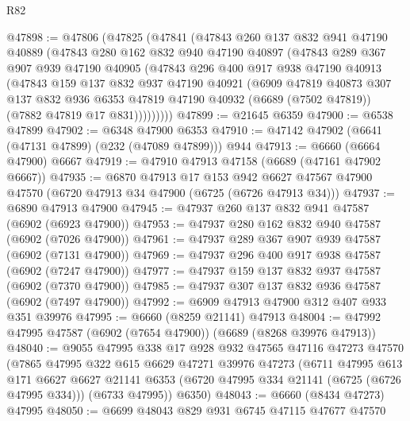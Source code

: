 \begin{lexlean}{R82}
\begin{coremodule}
@47898 := @47806
    (@47825
      (@47841
        (@47843
          @260
          @137
          @832
          @941
          @47190
          @40889
          (@47843
            @280
            @162
            @832
            @940
            @47190
            @40897
            (@47843
              @289
              @367
              @907
              @939
              @47190
              @40905
              (@47843
                @296
                @400
                @917
                @938
                @47190
                @40913
                (@47843
                  @159
                  @137
                  @832
                  @937
                  @47190
                  @40921
                  (@6909
                    @47819
                    @40873
                    @307
                    @137
                    @832
                    @936
                    @6353
                    @47819
                    @47190
                    @40932
                    (@6689 (@7502 @47819))
                    (@7882 @47819 @17 @831)))))))))
@47899 := @21645 @6359
@47900 := @6538 @47899
@47902 := @6348 @47900 @6353
@47910 := @47142 @47902 (@6641 (@47131 @47899) (@232 (@47089 @47899))) @944
@47913 := @6660 (@6664 @47900) @6667
@47919 := @47910 @47913 @47158 (@6689 (@47161 @47902 @6667))
@47935 := @6870
    @47913
    @17
    @153
    @942
    @6627
    @47567
    @47900
    @47570
    (@6720 @47913 @34 @47900 (@6725 (@6726 @47913 @34)))
@47937 := @6890 @47913 @47900
@47945 := @47937 @260 @137 @832 @941 @47587 (@6902 (@6923 @47900))
@47953 := @47937 @280 @162 @832 @940 @47587 (@6902 (@7026 @47900))
@47961 := @47937 @289 @367 @907 @939 @47587 (@6902 (@7131 @47900))
@47969 := @47937 @296 @400 @917 @938 @47587 (@6902 (@7247 @47900))
@47977 := @47937 @159 @137 @832 @937 @47587 (@6902 (@7370 @47900))
@47985 := @47937 @307 @137 @832 @936 @47587 (@6902 (@7497 @47900))
@47992 := @6909 @47913 @47900 @312 @407 @933 @351 @39976
@47995 := @6660 (@8259 @21141) @47913
@48004 := @47992 @47995 @47587 (@6902 (@7654 @47900)) (@6689 (@8268 @39976 @47913))
@48040 := @9055
    @47995
    @338
    @17
    @928
    @932
    @47565
    @47116
    @47273
    @47570
    (@7865
      @47995
      @322
      @615
      @6629
      @47271
      @39976
      @47273
      (@6711
        @47995
        @613
        @171
        @6627
        @6627
        @21141
        @6353
        (@6720 @47995 @334 @21141 (@6725 (@6726 @47995 @334)))
        (@6733 @47995))
      @6350)
@48043 := @6660 (@8434 @47273) @47995
@48050 := @6699 @48043 @829 @931 @6745 @47115 @47677 @47570

\end{coremodule}
\end{lexlean}

